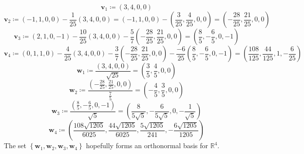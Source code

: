 \documentclass[12pt, letterpaper]{report}
\begin{document}
\begin{solution}
    \[
        \mathbf{v} _1\coloneqq (3,4,0,0)
    \]
    \[
        \mathbf{v}_2\coloneqq (-1,1,0,0)-\frac{1}{25}(3,4,0,0)=(-1,1,0,0)-\left( \frac{3}{25},\frac{4}{25},0,0 \right) =\left( -\frac{28}{25},\frac{21}{25},0,0 \right)
    \]
    \[
        \mathbf{v}_3\coloneqq (2,1,0,-1)-\frac{10}{25}(3,4,0,0)-\frac{5}{7}\left( -\frac{28}{25},\frac{21}{25},0,0 \right)=\left( \frac{8}{5},-\frac{6}{5},0,-1 \right) 
    \]
    \[
        \mathbf{v}_4\coloneqq (0,1,1,0)-\frac{4}{25}(3,4,0,0)-\frac{3}{7}\left( -\frac{28}{25},\frac{21}{25},0,0 \right)-\frac{-6}{25}\left( \frac{8}{5},-\frac{6}{5},0,-1 \right) =\left( \frac{108}{125},\frac{44}{125},1,-\frac{6}{25} \right) 
    \]
    \[
        \mathbf{w}_1\coloneqq \frac{(3,4,0,0)}{\sqrt{25} }=\left( \frac{3}{5},\frac{4}{5},0,0 \right) 
    \]
    \[
        \mathbf{w}_2\coloneqq \frac{\left( -\frac{28}{25},\frac{21}{25},0,0 \right) }{\frac{7}{5}}=\left( -\frac{4}{5},\frac{3}{5},0,0 \right) 
    \]
    \[
        \mathbf{w}_3\coloneqq \frac{\left( \frac{8}{5},-\frac{6}{5},0,-1 \right)}{\sqrt{5} }= \left( \frac{8}{5\sqrt{5} },-\frac{6}{5\sqrt{5} },0,-\frac{1}{\sqrt{5} } \right) 
    \]
    \[
        \mathbf{w}_4\coloneqq \left( \frac{108\sqrt{1205} }{6025},\frac{44\sqrt{1205} }{6025},\frac{5\sqrt{1205} }{241},-\frac{6\sqrt{1205} }{1205} \right) 
    \]
    The set \(\left\{ \mathbf{w}_1,\mathbf{w}_2,\mathbf{w}_3,\mathbf{w}_4 \right\} \) hopefully forms an orthonormal basis for \(\mathbb{R}^4\).
\end{solution}
\end{document}

